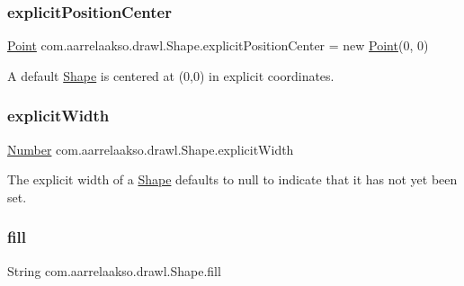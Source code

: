 \subsubsection{\texorpdfstring{explicit\+Position\+Center}{explicitPositionCenter}}
{\footnotesize\ttfamily \hyperlink{classcom_1_1aarrelaakso_1_1drawl_1_1_point}{Point} com.\+aarrelaakso.\+drawl.\+Shape.\+explicit\+Position\+Center = new \hyperlink{classcom_1_1aarrelaakso_1_1drawl_1_1_point}{Point}(0, 0)\hspace{0.3cm}{\ttfamily [private]}}



A default \hyperlink{classcom_1_1aarrelaakso_1_1drawl_1_1_shape}{Shape} is centered at (0,0) in explicit coordinates. 

\mbox{\label{classcom_1_1aarrelaakso_1_1drawl_1_1_shape_af297289dcb30e099587976e95431e327}} 
\subsubsection{\texorpdfstring{explicit\+Width}{explicitWidth}}
{\footnotesize\ttfamily \hyperlink{interfacecom_1_1aarrelaakso_1_1drawl_1_1_number}{Number} com.\+aarrelaakso.\+drawl.\+Shape.\+explicit\+Width\hspace{0.3cm}{\ttfamily [private]}}



The explicit width of a \hyperlink{classcom_1_1aarrelaakso_1_1drawl_1_1_shape}{Shape} defaults to {\ttfamily null} to indicate that it has not yet been set. 

\mbox{\label{classcom_1_1aarrelaakso_1_1drawl_1_1_shape_ade398fbc41c7814eebb5b4c7a62861f6}} 
\subsubsection{\texorpdfstring{fill}{fill}}
{\footnotesize\ttfamily String com.\+aarrelaakso.\+drawl.\+Shape.\+fill\hspace{0.3cm}{\ttfamily [private]}}



